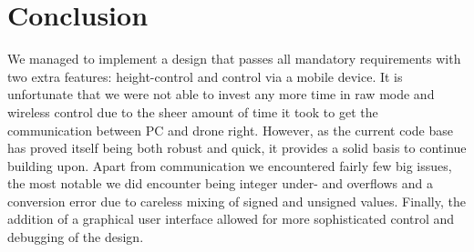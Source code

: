 \documentclass[final]{article}
\begin{document}
\section{Conclusion}
We managed to implement a design that passes all mandatory requirements with two extra features: height-control and control via a mobile device.
It is unfortunate that we were not able to invest any more time in raw mode and wireless control due to the sheer amount of time it took to get the communication between PC and drone right.
However, as the current code base has proved itself being both robust and quick, it provides a solid basis to continue building upon.
Apart from communication we encountered fairly few big issues, the most notable we did encounter being integer under- and overflows and a conversion error due to careless mixing of signed and unsigned values.
Finally, the addition of a graphical user interface allowed for more sophisticated control and debugging of the design.
\end{document}
